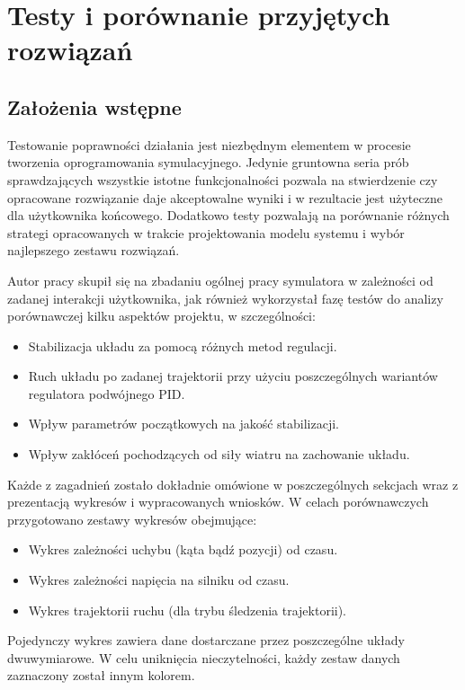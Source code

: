 \documentclass[12pt, twoside, openany]{report}
\theoremstyle{definition}
\begin{document}
\chapter{Testy i porównanie przyjętych rozwiązań}
\section{Założenia wstępne}
Testowanie poprawności działania jest niezbędnym elementem w procesie tworzenia oprogramowania symulacyjnego. Jedynie gruntowna seria prób sprawdzających wszystkie istotne funkcjonalności pozwala na stwierdzenie czy opracowane rozwiązanie daje akceptowalne wyniki i w rezultacie jest użyteczne dla użytkownika końcowego. Dodatkowo testy pozwalają na porównanie różnych strategi opracowanych w trakcie projektowania modelu systemu i wybór najlepszego zestawu rozwiązań. 

Autor pracy skupił się na zbadaniu ogólnej pracy symulatora w zależności od zadanej interakcji użytkownika, jak również wykorzystał fazę testów do analizy porównawczej kilku aspektów projektu, w szczególności:
\begin{itemize}
\item Stabilizacja układu za pomocą różnych metod regulacji.
\item Ruch układu po zadanej trajektorii przy użyciu poszczególnych wariantów regulatora podwójnego PID.
\item Wpływ parametrów początkowych na jakość stabilizacji.
\item Wpływ zakłóceń pochodzących od siły wiatru na zachowanie układu.
\end{itemize}

Każde z zagadnień zostało dokładnie omówione w poszczególnych sekcjach wraz z prezentacją wykresów i wypracowanych wniosków. W celach porównawczych przygotowano zestawy wykresów obejmujące:
\begin{itemize}
\item Wykres zależności uchybu (kąta bądź pozycji) od czasu.
\item Wykres zależności napięcia na silniku od czasu.
\item Wykres trajektorii ruchu (dla trybu śledzenia trajektorii).
\end{itemize}

Pojedynczy wykres zawiera dane dostarczane przez poszczególne układy dwuwymiarowe. W celu uniknięcia nieczytelności, każdy zestaw danych zaznaczony został innym kolorem.
\end{document}
